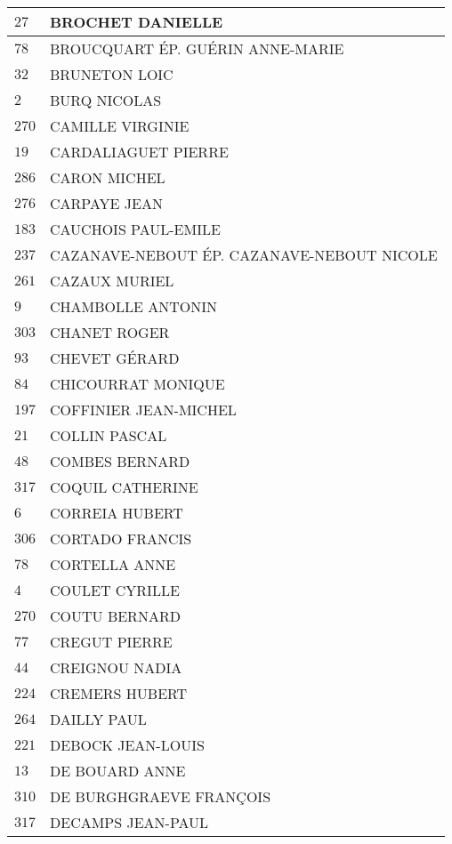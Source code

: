 \begin{xltabular}{\linewidth}{|l|X|}
    \hline
    $27$ & BROCHET DANIELLE \\
    \hline
    $78$ & BROUCQUART ÉP. GUÉRIN ANNE-MARIE \\
    \hline
    $32$ & BRUNETON LOIC \\
    \hline
    $2$ & BURQ NICOLAS \\
    \hline
    $270$ & CAMILLE VIRGINIE \\
    \hline
    $19$ & CARDALIAGUET PIERRE \\
    \hline
    $286$ & CARON MICHEL \\
    \hline
    $276$ & CARPAYE JEAN \\
    \hline
    $183$ & CAUCHOIS PAUL-EMILE \\
    \hline
    $237$ & CAZANAVE-NEBOUT ÉP. CAZANAVE-NEBOUT NICOLE \\
    \hline
    $261$ & CAZAUX MURIEL \\
    \hline
    $9$ & CHAMBOLLE ANTONIN \\
    \hline
    $303$ & CHANET ROGER \\
    \hline
    $93$ & CHEVET GÉRARD \\
    \hline
    $84$ & CHICOURRAT MONIQUE \\
    \hline
    $197$ & COFFINIER JEAN-MICHEL \\
    \hline
    $21$ & COLLIN PASCAL \\
    \hline
    $48$ & COMBES BERNARD \\
    \hline
    $317$ & COQUIL CATHERINE \\
    \hline
    $6$ & CORREIA HUBERT \\
    \hline
    $306$ & CORTADO FRANCIS \\
    \hline
    $78$ & CORTELLA ANNE \\
    \hline
    $4$ & COULET CYRILLE \\
    \hline
    $270$ & COUTU BERNARD \\
    \hline
    $77$ & CREGUT PIERRE \\
    \hline
    $44$ & CREIGNOU NADIA \\
    \hline
    $224$ & CREMERS HUBERT \\
    \hline
    $264$ & DAILLY PAUL \\
    \hline
    $221$ & DEBOCK JEAN-LOUIS \\
    \hline
    $13$ & DE BOUARD ANNE \\
    \hline
    $310$ & DE BURGHGRAEVE FRANÇOIS \\
    \hline
    $317$ & DECAMPS JEAN-PAUL \\

\end{xltabular}
